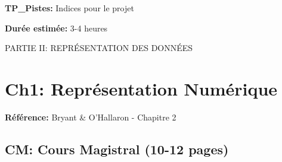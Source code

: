 \documentclass[10pt,a4paper]{article}
\begin{document}
\textbf{TP\_Pistes:} Indices pour le projet

\textbf{Durée estimée:} 3-4 heures

\newpage

\begin{partbox}
PARTIE II: REPRÉSENTATION DES DONNÉES
\end{partbox}

\section{Ch1: Représentation Numérique}

\textbf{Référence:} Bryant \& O'Hallaron - Chapitre 2

\subsection*{CM: Cours Magistral (10-12 pages)}
\end{document}

